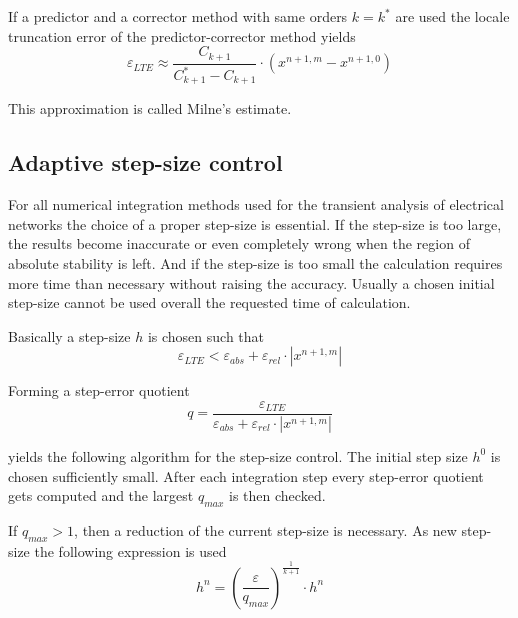 If a predictor and a corrector method with same orders $k = k^{*}$ are
used the locale truncation error of the predictor-corrector method
yields
\begin{equation}
\varepsilon_{LTE} \approx \dfrac{C_{k+1}}{C^{*}_{k+1} - C_{k+1}}\cdot \left(x^{n+1, m} - x^{n+1, 0}\right)
\end{equation}

This approximation is called Milne's estimate.

\subsection{Adaptive step-size control}

For all numerical integration methods used for the transient analysis
of electrical networks the choice of a proper step-size is essential.
If the step-size is too large, the results become inaccurate or even
completely wrong when the region of absolute stability is left.  And
if the step-size is too small the calculation requires more time than
necessary without raising the accuracy.  Usually a chosen initial
step-size cannot be used overall the requested time of calculation.

\addvspace{12pt}

Basically a step-size $h$ is chosen such that
\begin{equation}
\varepsilon_{LTE} < \varepsilon_{abs} + \varepsilon_{rel}\cdot \left|x^{n+1,m}\right|
\end{equation}

Forming a step-error quotient
\begin{equation}
q = \dfrac{\varepsilon_{LTE}}{\varepsilon_{abs} + \varepsilon_{rel}\cdot \left|x^{n+1,m}\right|}
\end{equation}

yields the following algorithm for the step-size control.  The initial
step size $h^0$ is chosen sufficiently small.  After each integration
step every step-error quotient gets computed and the largest $q_{max}$
is then checked.

\addvspace{12pt}

If $q_{max} > 1$, then a reduction of the current step-size is
necessary.  As new step-size the following expression is used
\begin{equation}
h^n = \left(\dfrac{\varepsilon}{q_{max}}\right)^{\tfrac{1}{k + 1}}\cdot h^n
\end{equation}

